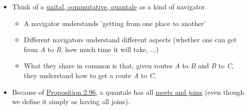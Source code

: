 \begin{itemize}
    \item Think of a \hyperref[D2.90]{unital, commutative, quantale} as a kind of navigator.
          \begin{itemize}
            \item A navigator understands 'getting from one place to another'
            \item Different navigators understand different aspects (whether one can get from \emph{A} to \emph{B}, how much time it will take, ...)
            \item What they share in common is that, given routes \emph{A} to \emph{B} and \emph{B} to \emph{C}, they understand how to get a route \emph{A} to \emph{C}.
          \end{itemize}
    \item Because of \hyperref[P2.96]{Proposition 2.96}, a quantale has all \hyperref[D1.81]{meets and joins} (even though we define it simply as having all joins).
  \end{itemize}
